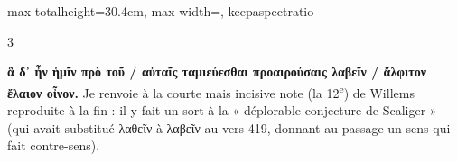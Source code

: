 \documentclass[11pt,twoside]{book}
\newcommand{\currHeadLE}{}
\newcommand{\currHeadRE}{}
\newcommand{\currHeadLO}{}
\newcommand{\currHeadRO}{}
\newcommand{\nieme}[1]{#1\textsuperscript{e}}
\newcommand{\R}{\textbf{R}}
\begin{document}
\begin{adjustbox}{max totalheight=30.4cm, max width=\textwidth, keepaspectratio}
\begin{minipage}{\textwidth}
{\begin{multicols}{3}
\par\vspace{1.5pt}
 \textbf{ἃ δ᾽ ἦν ἡμῖν πρὸ τοῦ / αὐταῖς ταμιεύεσθαι προαιρούσαις λαβεῖν / ἄλφιτον ἔλαιον οἶνον.} Je renvoie à la courte mais incisive note (la \nieme{12}) de Willems reproduite à la fin : il y fait un sort à la « déplorable conjecture de Scaliger » (qui avait substitué λαθεῖν à λαβεῖν au vers 419, donnant au passage un sens qui fait contre-sens).
\par\end{multicols}}
\end{minipage}\end{adjustbox}
\clearpage\ifodd\value{page}\hbox{}\newpage\fi
\renewcommand{\currHeadLE}{ΑΡΙΣΤΟΦΑΝΟΥΣ ΘΕΣΜΟΦΟΡΙΑΖΟΥΣΑΙ · CODEX RAVENNAS 429 (\R)}
\renewcommand{\currHeadRE}{Folio f. 167v (Classense 169v) · vv. 423–465}
\renewcommand{\currHeadLO}{FAC-SIMILÉ DU CODEX RAVENNAS 429 (\R) · f. 167v (Classense 169v)}
\renewcommand{\currHeadRO}{vv. 423–465 · Planche recadrée sur la zone écrite et harmonisée}
\end{document}
